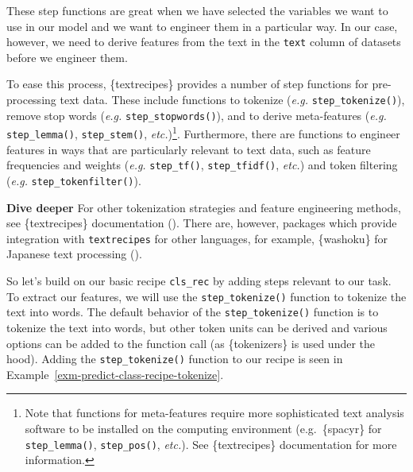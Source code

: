 \documentclass[
  letterpaper,
  krantz1]{latex/krantz-mod}
\theoremstyle{definition}
\theoremstyle{definition}
\theoremstyle{remark}
\begin{document}
These step functions are great when we have selected the variables we
want to use in our model and we want to engineer them in a particular
way. In our case, however, we need to derive features from the text in
the \texttt{text} column of datasets before we engineer them.

To ease this process, \{textrecipes\} provides a number of step
functions for pre-processing text data. These include functions to
tokenize (\emph{e.g.} \texttt{step\_tokenize()}), remove
stop words (\emph{e.g.} \texttt{step\_stopwords()}),
and to derive meta-features (\emph{e.g.}
\texttt{step\_lemma()}, \texttt{step\_stem()}, \emph{etc.})\footnote{Note
  that functions for meta-features require more sophisticated text
  analysis software to be installed on the computing environment
  (e.g.~\{spacyr\} for \texttt{step\_lemma()}, \texttt{step\_pos()},
  \emph{etc.}). See \{textrecipes\} documentation for more information.}.
Furthermore, there are functions to engineer features in ways that are
particularly relevant to text data, such as feature frequencies and
weights (\emph{e.g.} \texttt{step\_tf()}, \texttt{step\_tfidf()},
\emph{etc.}) and token filtering (\emph{e.g.}
\texttt{step\_tokenfilter()}).

\begin{tcolorbox}[enhanced jigsaw, toprule=.15mm, breakable, colback=white, arc=.35mm, left=2mm, colframe=quarto-callout-color-frame, opacityback=0, bottomrule=.15mm, rightrule=.15mm, leftrule=.75mm]

\textbf{ Dive deeper} For other tokenization strategies
and feature engineering methods, see \{textrecipes\} documentation
(). There are, however,
packages which provide integration with \texttt{textrecipes} for other
languages, for example, \{washoku\} for Japanese text processing
().

\end{tcolorbox}

So let's build on our basic recipe \texttt{cls\_rec} by adding steps
relevant to our task. To extract our features, we will use the
\texttt{step\_tokenize()} function to tokenize the text into words. The
default behavior of the \texttt{step\_tokenize()} function is to
tokenize the text into words, but other token units can be derived and
various options can be added to the function call (as \{tokenizers\} is
used under the hood). Adding the \texttt{step\_tokenize()} function to
our recipe is seen in Example~\ref{exm-predict-class-recipe-tokenize}.
\end{document}
